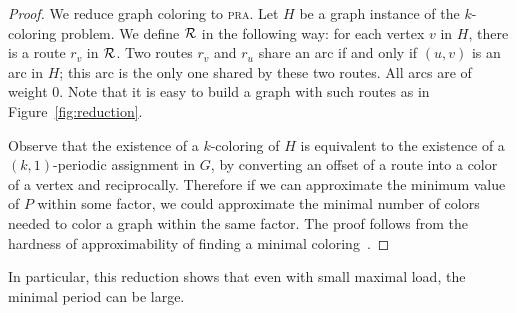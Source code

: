 \documentclass[10pt, conference, letterpaper]{IEEEtran}
\newcommand\pra{\textsc{pra}\xspace}
\begin{document}
\begin{proof}
 We reduce graph coloring to \pra. Let $H$ be a graph instance of the $k$-coloring problem. 
 We define ${\cal R}$ in the following way: for each vertex $v$ in $H$, there is a route $r_v$ in ${\cal R}$.
 Two routes $r_v$ and $r_u$ share an arc if and only if $(u,v)$ is an arc in $H$; this arc is the only one shared by these two routes. All arcs are of weight $0$. Note that it is easy to build a graph with such routes as in Figure~\ref{fig:reduction}.
 
 Observe that the existence of a $k$-coloring of $H$ is equivalent to the existence of a $(k,1)$-periodic assignment in $G$, 
 by converting an offset of a route into a color of a vertex and reciprocally. Therefore if we can approximate the minimum value of $P$ within some factor, we could approximate the minimal number of colors needed to color a graph within the same factor. The proof follows from the hardness of approximability of finding a minimal coloring~\cite{zuckerman2006linear}.
\end{proof}


In particular, this reduction shows that even with small maximal load, the minimal period can be large.
\end{document}
